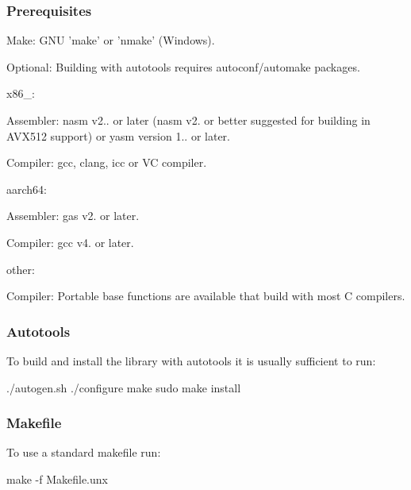 \subsubsection*{Prerequisites}


\begin{DoxyItemize}
\item Make\-: G\-N\-U 'make' or 'nmake' (Windows).
\item Optional\-: Building with autotools requires autoconf/automake packages.
\end{DoxyItemize}

x86\-\_\-:
\begin{DoxyItemize}
\item Assembler\-: nasm v2.. or later (nasm v2. or better suggested for building in A\-V\-X512 support) or yasm version 1.. or later.
\item Compiler\-: gcc, clang, icc or V\-C compiler.
\end{DoxyItemize}

aarch64\-:
\begin{DoxyItemize}
\item Assembler\-: gas v2. or later.
\item Compiler\-: gcc v4. or later.
\end{DoxyItemize}

other\-:
\begin{DoxyItemize}
\item Compiler\-: Portable base functions are available that build with most C compilers.
\end{DoxyItemize}

\subsubsection*{Autotools}

To build and install the library with autotools it is usually sufficient to run\-: \begin{DoxyVerb}./autogen.sh
./configure
make
sudo make install
\end{DoxyVerb}


\subsubsection*{Makefile}

To use a standard makefile run\-: \begin{DoxyVerb}make -f Makefile.unx
\end{DoxyVerb}


